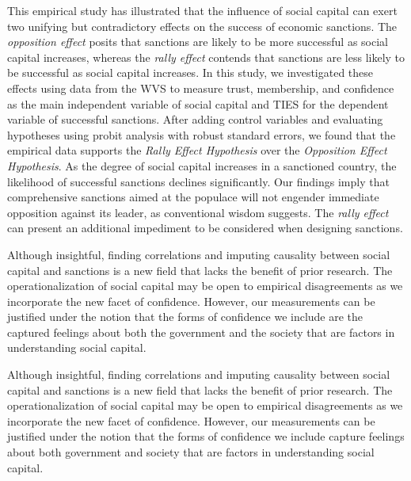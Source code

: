 \documentclass[12pt,]{article}
\begin{document}
This empirical study has illustrated that the influence of social
capital can exert two unifying but contradictory effects on the success
of economic sanctions. The \emph{opposition effect} posits that
sanctions are likely to be more successful as social capital increases,
whereas the \emph{rally effect} contends that sanctions are less likely
to be successful as social capital increases. In this study, we
investigated these effects using data from the WVS to measure trust,
membership, and confidence as the main independent variable of social
capital and TIES for the dependent variable of successful sanctions.
After adding control variables and evaluating hypotheses using probit
analysis with robust standard errors, we found that the empirical data
supports the \emph{Rally Effect Hypothesis} over the \emph{Opposition
Effect Hypothesis}. As the degree of social capital increases in a
sanctioned country, the likelihood of successful sanctions declines
significantly. Our findings imply that comprehensive sanctions aimed at
the populace will not engender immediate opposition against its leader,
as conventional wisdom suggests. The \emph{rally effect} can present an
additional impediment to be considered when designing sanctions.

Although insightful, finding correlations and imputing causality between
social capital and sanctions is a new field that lacks the benefit of
prior research. The operationalization of social capital may be open to
empirical disagreements as we incorporate the new facet of confidence.
However, our measurements can be justified under the notion that the
forms of confidence we include are the captured feelings about both the
government and the society that are factors in understanding social
capital.

Although insightful, finding correlations and imputing causality between
social capital and sanctions is a new field that lacks the benefit of
prior research. The operationalization of social capital may be open to
empirical disagreements as we incorporate the new facet of confidence.
However, our measurements can be justified under the notion that the
forms of confidence we include capture feelings about both government
and society that are factors in understanding social capital.

\newpage





\newpage
\singlespacing 

\end{document}
